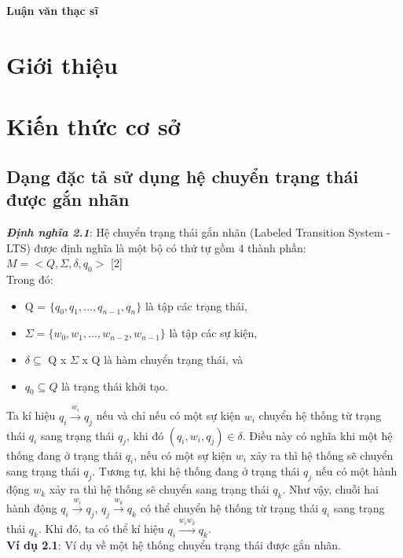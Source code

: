 \documentclass[a4paper,13pt,oneside,openany]{book}
\begin{document}
	\begin{center}
		\textbf{\large Luận văn thạc sĩ}
	\end{center}
	\begin{flushleft}
	\chapter{Giới thiệu}
	\chapter{Kiến thức cơ sở}
		\section{Dạng đặc tả sử dụng hệ chuyển trạng thái được gắn nhãn}
		\justify
		\textbf{\textit{Định nghĩa 2.1}}: Hệ chuyển trạng thái gắn nhãn (Labeled Transition System - LTS) được định nghĩa là một bộ có thứ tự gồm 4 thành phần: $M = <Q, \Sigma, \delta, q_{0}>$ [2]\\
		Trong đó:\\
		\begin{itemize}
			\item Q = $\{q_{0}, q_{1}, ..., q_{n-1}, q_{n}\}$ là tập các trạng thái,
			\item $\Sigma = \{w_{0}, w_{1}, ..., w_{n-2}, w_{n-1}\}$ là tập các sự kiện,
			\item $\delta \subseteq$ Q x $\Sigma$ x Q là hàm chuyển trạng thái, và
			\item $q_{0} \subseteq Q$ là trạng thái khởi tạo.\\
		\end{itemize}
		Ta kí hiệu $q_i \overset{w_i}{\longrightarrow} q_{j}$ nếu và chỉ nếu có một sự kiện $w_i$ chuyển hệ thống từ trạng thái $q_i$ sang trạng thái $q_j$, khi đó $(q_i, w_i, q_j) \in \delta$. Điều này có nghĩa khi một hệ thống đang ở trạng thái $q_i$, nếu có một sự kiện $w_i$ xảy ra thì hệ thống sẽ chuyển sang trạng thái $q_j$. Tương tự, khi hệ thống đang ở trạng thái $q_j$ nếu có một hành động $w_k$ xảy ra thì hệ thống sẽ chuyển sang trạng thái $q_k$. Như vậy, chuỗi hai hành động  $q_i \overset{w_i}{\longrightarrow} q_j$,  $q_j \overset{w_k}{\longrightarrow} q_k$ có thể chuyển hệ thống từ trạng thái $q_i$ sang trạng thái $q_k$. Khi đó, ta có thể kí hiệu  $q_i \overset{w_iw_k}{\longrightarrow} q_{k}$.\\
		\textbf{Ví dụ 2.1}: Ví dụ về một hệ thống chuyển trạng thái được gắn nhãn.\\
		\begin{figure}[h]

\end{figure}
\end{flushleft}
\end{document}
